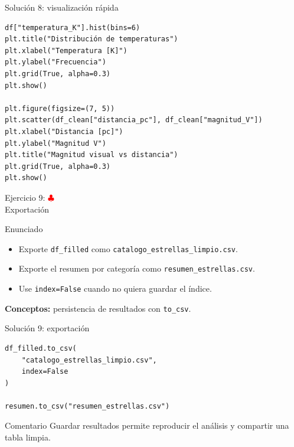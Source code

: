 \documentclass[10pt]{beamer}
\begin{document}
\begin{solutionblock}
\begin{frame}[fragile,shrink=5]{Solución 8: visualización rápida}
\begin{verbatim}
df["temperatura_K"].hist(bins=6)
plt.title("Distribución de temperaturas")
plt.xlabel("Temperatura [K]")
plt.ylabel("Frecuencia")
plt.grid(True, alpha=0.3)
plt.show()

plt.figure(figsize=(7, 5))
plt.scatter(df_clean["distancia_pc"], df_clean["magnitud_V"])
plt.xlabel("Distancia [pc]")
plt.ylabel("Magnitud V")
plt.title("Magnitud visual vs distancia")
plt.grid(True, alpha=0.3)
plt.show()
\end{verbatim}
\end{frame}
\end{solutionblock}

\begin{frame}{Ejercicio 9: \hfill \textcolor{red}{$\clubsuit$} \\ Exportación}
  \begin{block}{Enunciado}
    \begin{itemize}
      \item Exporte \texttt{df\_filled} como \texttt{catalogo\_estrellas\_limpio.csv}.
      \item Exporte el resumen por categoría como \texttt{resumen\_estrellas.csv}.
      \item Use \texttt{index=False} cuando no quiera guardar el índice.
    \end{itemize}
  \end{block}
  \textbf{Conceptos:} persistencia de resultados con \texttt{to\_csv}.
\end{frame}

\begin{solutionblock}
\begin{frame}[fragile]{Solución 9: exportación}
\begin{verbatim}
df_filled.to_csv(
    "catalogo_estrellas_limpio.csv",
    index=False
)

resumen.to_csv("resumen_estrellas.csv")
\end{verbatim}

\begin{block}{Comentario}
  Guardar resultados permite reproducir el análisis y compartir una tabla limpia.
\end{block}
\end{frame}
\end{solutionblock}
\end{document}
